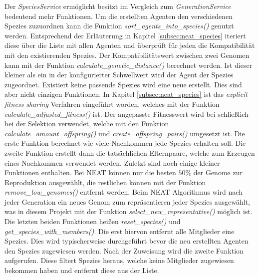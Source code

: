 Der \emph{SpeciesService} ermöglicht besitzt im Vergleich zum \emph{GenerationService} bedeutend mehr Funktionen. Um die erstellten Agenten den verschiedenen Spezies zuzuordnen kann die Funktion \emph{ sort\_agents\_into\_species()} genutzt werden. Entsprechend der Erläuterung in Kapitel \ref{subsec:neat_species} iteriert diese über die Liste mit allen Agenten und überprüft für jeden die Kompatibilität mit den existierenden Spezies. Der Kompatibilitätswert zwischen zwei Genomen kann mit der Funktion \emph{calculate\_genetic\_distance()} berechnet werden. Ist dieser kleiner als ein in der konfigurierter Schwellwert wird der Agent der Spezies zugeordnet. Existiert keine passende Spezies wird eine neue erstellt. Dies sind aber nicht einzigen Funktionen. In Kapitel \ref{subsec:neat_species} ist das \emph{explicit fitness sharing} Verfahren eingeführt worden, welches mit der Funktion \emph{calculate\_adjusted\_fitness()} ist. Der angepasste Fitnesswert wird bei schließlich bei der Selektion verwendet, welche mit den Funktion \emph{calculate\_amount\_offspring()} und \emph{create\_offspring\_pairs()} umgesetzt ist. Die erste Funktion berechnet wie viele Nachkommen jede Spezies erhalten soll. Die zweite Funktion erstellt dann die tatsächlichen Elternpaare, welche zum Erzeugen eines Nachkommen verwendet werden. Zuletzt sind noch einige kleiner Funktionen enthalten. Bei \ac{NEAT} können nur die besten $50\%$ der Genome zur Reproduktion ausgewählt, die restlichen können mit der Funktion \emph{remove\_low\_genomes()} entfernt werden. Beim \ac{NEAT} Algorithmus wird nach jeder Generation ein neues Genom zum repräsentieren jeder Spezies ausgewählt, was in diesem Projekt mit der Funktion \emph{select\_new\_representative()} möglich ist. Die letzten beiden Funktionen heißen \emph{reset\_species()} und \emph{get\_species\_with\_members()}. Die erst hiervon entfernt alle Mitglieder eine Spezies. Dies wird typischerweise durchgeführt bevor die neu erstellten Agenten den Spezies zugewiesen werden. Nach der Zuweisung wird die zweite Funktion aufgerufen. Diese filtert Spezies heraus, welche keine Mitglieder zugewiesen bekommen haben und entfernt diese aus der Liste. 


